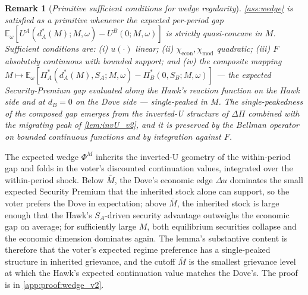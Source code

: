 \documentclass[11pt,twoside]{extarticle}
\newtheorem{remark}{Remark}
\begin{document}
\begin{remark}[\emph{Primitive sufficient conditions for wedge regularity}]\label{rem:wedge_primitive}
\autoref{ass:wedge} is satisfied as a primitive whenever the expected per-period gap $\mathbb{E}_\omega[U^A(d_A^*(M);M,\omega)-U^B(0;M,\omega)]$ is strictly quasi-concave in $M$. Sufficient conditions are: (i) $u(\cdot)$ linear; (ii) $\chi_{\mathrm{econ}},\chi_{\mathrm{mod}}$ quadratic; (iii) $F$ absolutely continuous with bounded support; and (iv) the composite mapping $M\mapsto\mathbb{E}_\omega[\Pi_A^*(d_A^*(M),S_A;M,\omega)-\Pi_B^*(0,S_B;M,\omega)]$ — the expected Security-Premium gap evaluated along the Hawk's reaction function on the Hawk side and at $d_B=0$ on the Dove side — single-peaked in $M$. The single-peakedness of the composed gap emerges from the inverted-U structure of $\Delta\Pi$ combined with the migrating peak of \autoref{lem:invU_v2}, and it is preserved by the Bellman operator on bounded continuous functions and by integration against $F$.
\end{remark}

The expected wedge $\Phi^M$ inherits the inverted-U geometry of the within-period gap and folds in the voter's discounted continuation values, integrated over the within-period shock. Below $\bar M$, the Dove's economic edge $\Delta u$ dominates the small expected Security Premium that the inherited stock alone can support, so the voter prefers the Dove in expectation; above $\bar M$, the inherited stock is large enough that the Hawk's $S_A$-driven security advantage outweighs the economic gap on average; for sufficiently large $M$, both equilibrium securities collapse and the economic dimension dominates again. The lemma's substantive content is therefore that the voter's expected regime preference has a single-peaked structure in inherited grievance, and the cutoff $\bar M$ is the smallest grievance level at which the Hawk's expected continuation value matches the Dove's. The proof is in \autoref{app:proof:wedge_v2}.
\end{document}
